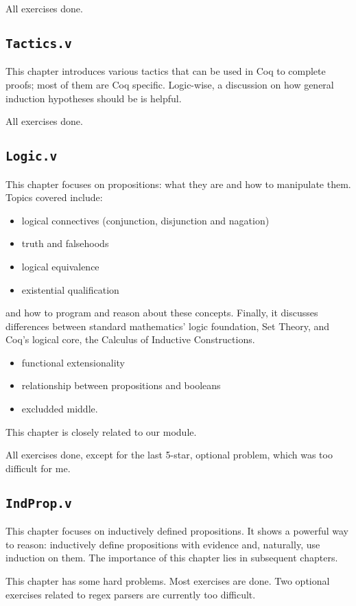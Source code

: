 \documentclass[screen,sigplan]{acmart}\settopmatter{printfolios=true,printccs=false,printacmref=false}
\begin{document}
All exercises done.


\subsection{\texttt{Tactics.v}}
This chapter introduces various tactics that can be used in Coq to complete proofs;
most of them are Coq specific. Logic-wise, a discussion on how general induction hypotheses should be
is helpful.

All exercises done.


\subsection{\texttt{Logic.v}}
This chapter focuses on propositions: what they are and how to manipulate them.
Topics covered include: 
\begin{itemize}
  \item logical connectives (conjunction, disjunction and nagation)
  \item truth and falsehoods
  \item logical equivalence
  \item existential qualification
\end{itemize}
and how to program and reason about these concepts. Finally, it discusses
differences between standard mathematics' logic foundation, Set Theory, and Coq's
logical core, the Calculus of Inductive Constructions.
\begin{itemize}
  \item functional extensionality
  \item relationship between propositions and booleans
  \item excludded middle.
\end{itemize}

This chapter is closely related to our module.

All exercises done, except for the last 5-star, optional problem, which was too difficult for me.


\subsection{\texttt{IndProp.v}}
This chapter focuses on inductively defined propositions. It shows a powerful way to reason: inductively
define propositions with evidence and, naturally, use induction on them. The importance of this chapter
lies in subsequent chapters.

This chapter has some hard problems. Most exercises are done. Two optional exercises related to regex parsers are currently too difficult.
\end{document}
